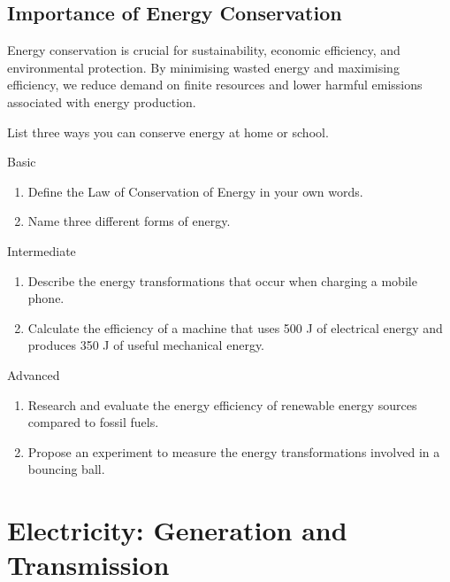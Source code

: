 \subsection{Importance of Energy Conservation}

Energy conservation is crucial for sustainability, economic efficiency, and environmental protection. By minimising wasted energy and maximising efficiency, we reduce demand on finite resources and lower harmful emissions associated with energy production.

\begin{stopandthink}
List three ways you can conserve energy at home or school.
\end{stopandthink}

\begin{tieredquestions}{Basic}
\begin{enumerate}
    \item Define the Law of Conservation of Energy in your own words.
    \item Name three different forms of energy.
\end{enumerate}
\end{tieredquestions}

\begin{tieredquestions}{Intermediate}
\begin{enumerate}
    \item Describe the energy transformations that occur when charging a mobile phone.
    \item Calculate the efficiency of a machine that uses 500 J of electrical energy and produces 350 J of useful mechanical energy.
\end{enumerate}
\end{tieredquestions}

\begin{tieredquestions}{Advanced}
\begin{enumerate}
    \item Research and evaluate the energy efficiency of renewable energy sources compared to fossil fuels.
    \item Propose an experiment to measure the energy transformations involved in a bouncing ball.
\end{enumerate}
\end{tieredquestions}

\section{Electricity: Generation and Transmission}


